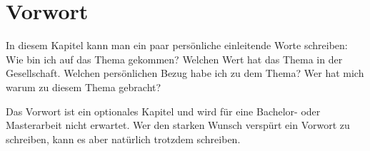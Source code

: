 

\section*{Vorwort}

In diesem Kapitel kann man ein paar persönliche einleitende Worte schreiben: Wie bin ich auf das Thema gekommen? Welchen Wert hat das Thema in der Gesellschaft. Welchen persönlichen Bezug habe ich zu dem Thema? Wer hat mich warum zu diesem Thema gebracht?


Das Vorwort ist ein optionales Kapitel und wird für eine Bachelor- oder Masterarbeit nicht erwartet. Wer den starken Wunsch verspürt ein Vorwort zu schreiben, kann es aber natürlich trotzdem schreiben.